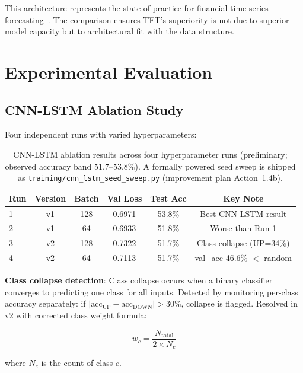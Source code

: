 \documentclass[conference]{IEEEtran}
\begin{document}
This architecture represents the state-of-practice for financial time series forecasting~\cite{ref:cnn_lstm,ref:financial_cnn}. The comparison ensures TFT's superiority is not due to superior model capacity but to architectural fit with the data structure.

\section{Experimental Evaluation}\label{sec:experiments}

\subsection{CNN-LSTM Ablation Study}

Four independent runs with varied hyperparameters:

\begin{table}[htbp]
\centering
\caption{CNN-LSTM ablation results across four hyperparameter runs (preliminary; observed accuracy band $51.7$--$53.8\%$). A formally powered seed sweep is shipped as \texttt{training/cnn\_lstm\_seed\_sweep.py} (improvement plan Action~1.4b).}
\label{tab:cnn_lstm_ablation}
\small
\begin{tabular}{lccccc}
\toprule
\textbf{Run} & \textbf{Version} & \textbf{Batch} & \textbf{Val Loss} & \textbf{Test Acc} & \textbf{Key Note} \\
\midrule
1 & v1 & 128 & 0.6971 & 53.8\% & Best CNN-LSTM result \\
2 & v1 & 64 & 0.6933 & 51.8\% & Worse than Run 1 \\
3 & v2 & 128 & 0.7322 & 51.7\% & Class collapse (UP=34\%) \\
4 & v2 & 64 & 0.7113 & 51.7\% & val\_acc 46.6\% $<$ random \\
\bottomrule
\end{tabular}
\normalsize
\end{table}

\textbf{Class collapse detection}: Class collapse occurs when a binary classifier converges to predicting one class for all inputs. Detected by monitoring per-class accuracy separately: if $|\text{acc}_{\text{UP}} - \text{acc}_{\text{DOWN}}| > 30\%$, collapse is flagged. Resolved in v2 with corrected class weight formula:

\begin{equation}
w_c = \frac{N_{\text{total}}}{2 \times N_c}
\end{equation}

where $N_c$ is the count of class $c$.
\end{document}
